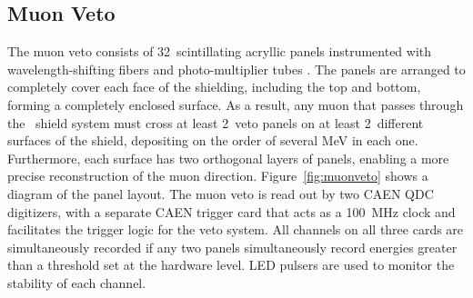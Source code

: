 \documentclass[/main.tex]{subfiles}
\begin{document}
\subsection{Muon Veto}\label{sec:muonveto}
The muon veto consists of 32~scintillating acryllic panels instrumented with wavelength-shifting fibers and photo-multiplier tubes \cite{2015wiseman}.
The panels are arranged to completely cover each face of the shielding, including the top and bottom, forming a completely enclosed surface.
As a result, any muon that passes through the \MJD\ shield system must cross at least 2~veto panels on at least 2~different surfaces of the shield, depositing on the order of several MeV in each one.
Furthermore, each surface has two orthogonal layers of panels, enabling a more precise reconstruction of the muon direction.
Figure~\ref{fig:muonveto} shows a diagram of the panel layout.
The muon veto is read out by two CAEN QDC digitizers, with a separate CAEN trigger card that acts as a 100~MHz clock and facilitates the trigger logic for the veto system.
All channels on all three cards are simultaneously recorded if any two panels simultaneously record energies greater than a threshold set at the hardware level.
LED pulsers are used to monitor the stability of each channel.
\end{document}
